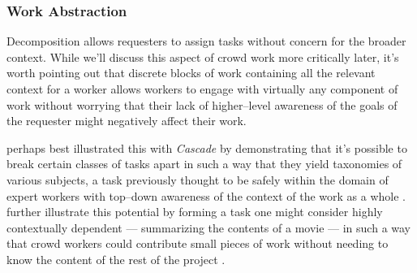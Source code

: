 \documentclass[trackingWork]{subfiles}
\begin{document}







\subsubsection{Work Abstraction}\label{sec:workAbstraction}
Decomposition allows requesters to assign tasks without concern for the broader context.
While we'll discuss this aspect of crowd work more critically later,
it's worth pointing out that discrete blocks of work containing all the relevant context for a worker
allows workers to engage with virtually any component of work without worrying that their lack of 
higher--level awareness of the goals of the requester might negatively affect their work.

\citeauthor{chilton2013cascade} perhaps best illustrated this with
\textit{Cascade} by demonstrating that it's possible to
break certain classes of tasks apart
in such a way that they yield taxonomies of various subjects,
a task previously thought to be safely within the domain of expert workers
with top--down awareness of the context of the work as a whole
\cite{chilton2013cascade}.
\citeauthor{verroios2014context} further illustrate this potential by
forming a task one might consider highly contextually dependent
--- summarizing the contents of a movie ---
in such a way that crowd workers could contribute small pieces of work without
needing to know the content of the rest of the project
\cite{verroios2014context}.
\end{document}
